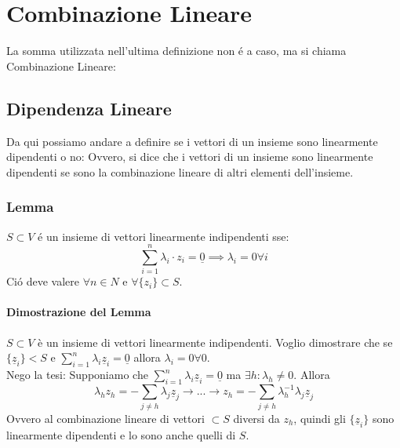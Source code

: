 \section{Combinazione Lineare}
La somma utilizzata nell'ultima definizione non é a caso, ma si chiama Combinazione Lineare:
\subsection*{Dipendenza Lineare}
Da qui possiamo andare a definire se i vettori di un insieme sono linearmente dipendenti o no:
Ovvero, si dice che i vettori di un insieme sono linearmente dipendenti se sono la combinazione lineare di altri elementi dell'insieme.
\subsubsection*{Lemma}
$S\subset V$ é un insieme di vettori linearmente indipendenti sse:
\[ \sum_{i=1}^{n} \lambda_i \cdot z_i = \underline{0} \implies \lambda_i = 0 \forall i \]
Ció deve valere $\forall n \in N$ e $\forall \{z_i\} \subset S$.

\paragraph{Dimostrazione del Lemma}
$S\subset V$ è un insieme di vettori linearmente indipendenti.
Voglio dimostrare che se $\{\underline{z}_i \}<S$ e $\sum_{i=1}^{n} \lambda_i \underline{z}_i = \underline{0}$ allora $\lambda_i=0 \forall 0$.
\\Nego la tesi: Supponiamo che  $\sum_{i=1}^{n} \lambda_i \underline{z}_i = \underline{0}$ ma $\exists h : \lambda_h \neq 0$.
Allora 
\[\lambda_h z_h = -\sum_{j\neq h} \lambda_j \underline{z}_j \to ... \to z_h = -\sum_{j\neq h} \lambda_h^{-1} \lambda_j \underline{z}_j\]
Ovvero al combinazione lineare di vettori $\subset S$ diversi da $z_h$, quindi gli $\{\underline{z}_i \}$ sono linearmente dipendenti e lo sono anche quelli di $S$.

